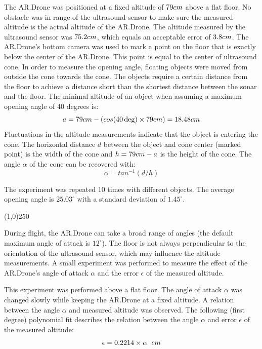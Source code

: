 The AR.Drone was positioned at a fixed altitude of $79\small{cm}$ above a flat floor.
No obstacle was in range of the ultrasound sensor to make sure the measured altitude is the actual altitude of the AR.Drone.
The altitude measured by the ultrasound sensor was $75.2\small{cm}$, which equals an acceptable error of $3.8\small{cm}$.
The AR.Drone's bottom camera was used to mark a point on the floor that is exactly below the center of the AR.Drone.
This point is equal to the center of ultrasound cone.
In order to measure the opening angle, floating objects were moved from outside the cone towards the cone.
The objects require a certain distance from the floor to achieve a distance short than the shortest distance between the sonar and the floor.
The minimal altitude of an object when assuming a maximum opening angle of 40 degrees is:
\begin{equation}
a = 79\small{cm} - (cos(40\deg) \times 79\small{cm}) = 18.48\small{cm}
\end{equation}
Fluctuations in the altitude measurements indicate that the object is entering the cone.
The horizontal distance $d$ between the object and cone center (marked point) is the width of the cone and $h = 79\small{cm} - a$ is the height of the cone.
The angle $\alpha$ of the cone can be recovered with:
\begin{equation}
\alpha = tan^{-1}(d / h)
\end{equation}

The experiment was repeated 10 times with different objects.
The average opening angle is $25.03^{\circ}$ with a standard deviation of $1.45^{\circ}$.
\normalsize
\normalcolor


\begin{center}
\line(1,0){250}
\end{center}
\color{mediumgray}
\small

During flight, the AR.Drone can take a broad range of angles (the default maximum angle of attack is $12^{\circ}$).
The floor is not always perpendicular to the orientation of the ultrasound sensor, which may influence the altitude measurements.
A small experiment was performed to measure the effect of the AR.Drone's angle of attack $\alpha$ and the error $\epsilon$ of the measured altitude.

This experiment was performed above a flat floor.
The angle of attack $\alpha$ was changed slowly while keeping the AR.Drone at a fixed altitude.
A relation between the angle $\alpha$ and measured altitude was observed.
The following (first degree) polynomial fit describes the relation between the angle $\alpha$ and error $\epsilon$ of the measured altitude:
\begin{equation}
\epsilon = 0.2214 \times \alpha \hspace{0.2cm} \small{cm}
\end{equation}
\normalsize
\normalcolor



